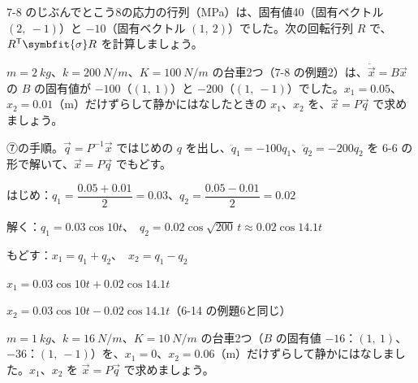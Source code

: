 \begin{jibun}
7-8 のじぶんでとこう8の応力の行列（MPa）は、固有値40（固有ベクトル $(2,\ -1)$）と $-10$（固有ベクトル $(1,\ 2)$）でした。次の回転行列 $R$ で、$R^{\mathsf T}\symbfit{\sigma} R$ を計算しましょう。
\end{jibun}

\begin{reidai}
$m=\qty{2}{kg}$、$k=\qty{200}{N/m}$、$K=\qty{100}{N/m}$ の台車2つ（7-8 の例題2）は、$\ddot{\vec x}=B\vec x$ の $B$ の固有値が $-100$（$(1,\ 1)$）と $-200$（$(1,\ -1)$）でした。$x_1=0.05$、$x_2=0.01$（m）だけずらして静かにはなしたときの $x_1$、$x_2$ を、$\vec x=P\vec q$ で求めましょう。\par
\kangaekata ⑦の手順。$\vec q=P^{-1}\vec x$ ではじめの $q$ を出し、$\ddot q_1=-100q_1$、$\ddot q_2=-200q_2$ を 6-6 の形で解いて、$\vec x=P\vec q$ でもどす。\par
\shiki\kviijs{}\zw{} はじめ：$q_1=\dfrac{0.05+0.01}{2}=0.03$、$q_2=\dfrac{0.05-0.01}{2}=0.02$\par
\kviija 解く：$q_1=0.03\cos10t$、\ $q_2=0.02\cos\sqrt{200}\,t\approx0.02\cos14.1t$\par
\kviija もどす：$x_1=q_1+q_2$、\ $x_2=q_1-q_2$\par
\kotae\kviijs{}\zw{} $x_1=0.03\cos10t+0.02\cos14.1t$\par
\kviija $x_2=0.03\cos10t-0.02\cos14.1t$（6-14 の例題6と同じ）
\end{reidai}

\begin{jibun}
$m=\qty{1}{kg}$、$k=\qty{16}{N/m}$、$K=\qty{10}{N/m}$ の台車2つ（$B$ の固有値 $-16$：$(1,\ 1)$、$-36$：$(1,\ -1)$）を、$x_1=0$、$x_2=0.06$（m）だけずらして静かにはなしました。$x_1$、$x_2$ を $\vec x=P\vec q$ で求めましょう。
\end{jibun}

